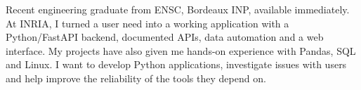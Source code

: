 
\begin{cvparagraph}
Recent engineering graduate from ENSC, Bordeaux INP, available immediately. At INRIA, I turned a user need into a working application with a Python/FastAPI backend, documented APIs, data automation and a web interface. My projects have also given me hands-on experience with Pandas, SQL and Linux. I want to develop Python applications, investigate issues with users and help improve the reliability of the tools they depend on.
\end{cvparagraph}
